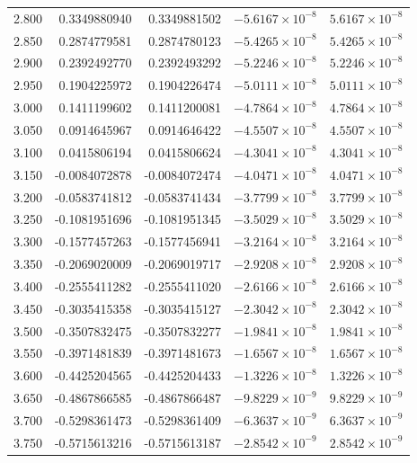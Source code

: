 \documentclass[11pt,a4paper]{article}
\begin{document}
\begin{longtable}{rrrrr}
2.800 & 0.3349880940 & 0.3349881502 & $-5.6167\times 10^{-8}$ & $5.6167\times 10^{-8}$ \\
2.850 & 0.2874779581 & 0.2874780123 & $-5.4265\times 10^{-8}$ & $5.4265\times 10^{-8}$ \\
2.900 & 0.2392492770 & 0.2392493292 & $-5.2246\times 10^{-8}$ & $5.2246\times 10^{-8}$ \\
2.950 & 0.1904225972 & 0.1904226474 & $-5.0111\times 10^{-8}$ & $5.0111\times 10^{-8}$ \\
3.000 & 0.1411199602 & 0.1411200081 & $-4.7864\times 10^{-8}$ & $4.7864\times 10^{-8}$ \\
3.050 & 0.0914645967 & 0.0914646422 & $-4.5507\times 10^{-8}$ & $4.5507\times 10^{-8}$ \\
3.100 & 0.0415806194 & 0.0415806624 & $-4.3041\times 10^{-8}$ & $4.3041\times 10^{-8}$ \\
3.150 & -0.0084072878 & -0.0084072474 & $-4.0471\times 10^{-8}$ & $4.0471\times 10^{-8}$ \\
3.200 & -0.0583741812 & -0.0583741434 & $-3.7799\times 10^{-8}$ & $3.7799\times 10^{-8}$ \\
3.250 & -0.1081951696 & -0.1081951345 & $-3.5029\times 10^{-8}$ & $3.5029\times 10^{-8}$ \\
3.300 & -0.1577457263 & -0.1577456941 & $-3.2164\times 10^{-8}$ & $3.2164\times 10^{-8}$ \\
3.350 & -0.2069020009 & -0.2069019717 & $-2.9208\times 10^{-8}$ & $2.9208\times 10^{-8}$ \\
3.400 & -0.2555411282 & -0.2555411020 & $-2.6166\times 10^{-8}$ & $2.6166\times 10^{-8}$ \\
3.450 & -0.3035415358 & -0.3035415127 & $-2.3042\times 10^{-8}$ & $2.3042\times 10^{-8}$ \\
3.500 & -0.3507832475 & -0.3507832277 & $-1.9841\times 10^{-8}$ & $1.9841\times 10^{-8}$ \\
3.550 & -0.3971481839 & -0.3971481673 & $-1.6567\times 10^{-8}$ & $1.6567\times 10^{-8}$ \\
3.600 & -0.4425204565 & -0.4425204433 & $-1.3226\times 10^{-8}$ & $1.3226\times 10^{-8}$ \\
3.650 & -0.4867866585 & -0.4867866487 & $-9.8229\times 10^{-9}$ & $9.8229\times 10^{-9}$ \\
3.700 & -0.5298361473 & -0.5298361409 & $-6.3637\times 10^{-9}$ & $6.3637\times 10^{-9}$ \\
3.750 & -0.5715613216 & -0.5715613187 & $-2.8542\times 10^{-9}$ & $2.8542\times 10^{-9}$ \\

\end{longtable}
\end{document}
